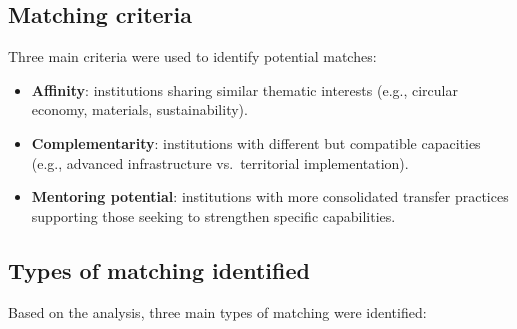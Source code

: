 \documentclass[
  12pt,
  oneside]{book}
\providecommand{\tightlist}{%
  \setlength{\itemsep}{0pt}\setlength{\parskip}{0pt}}
\begin{document}
\subsection{Matching criteria}\label{matching-criteria}

Three main criteria were used to identify potential matches:

\begin{itemize}
\tightlist
\item
  \textbf{Affinity}: institutions sharing similar thematic interests
  (e.g., circular economy, materials, sustainability).
\item
  \textbf{Complementarity}: institutions with different but compatible
  capacities (e.g., advanced infrastructure vs.~territorial
  implementation).
\item
  \textbf{Mentoring potential}: institutions with more consolidated
  transfer practices supporting those seeking to strengthen specific
  capabilities.
\end{itemize}

\subsection{Types of matching
identified}\label{types-of-matching-identified}

Based on the analysis, three main types of matching were identified:
\end{document}
